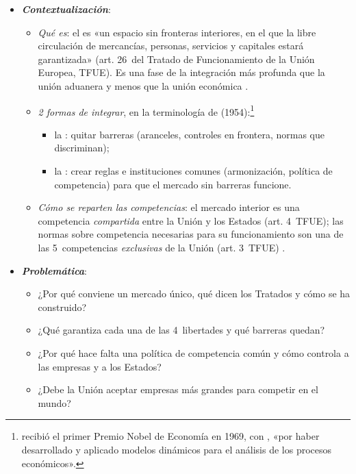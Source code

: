\documentclass[11pt]{article}
\begin{document}
\begin{itemize}
\item \textbf{\emph{Contextualización}}:
  \begin{itemize}
  \item \emph{Qué es}: el  es «un espacio sin fronteras interiores, en el que la libre circulación de mercancías, personas, servicios y capitales estará garantizada» (art. 26~del Tratado de Funcionamiento de la Unión Europea, TFUE)\nocite{UE2016TFUE}. Es una fase de la integración más profunda que la unión aduanera y menos que la unión económica .
  \item \emph{2 formas de integrar}, en la terminología de  (1954)\nocite{Tinbergen1954International}:\footnote{ recibió el primer Premio Nobel de Economía en 1969, con , «por haber desarrollado y aplicado modelos dinámicos para el análisis de los procesos económicos»\nocite{Nobel1969FrischTinbergen}.}
    \begin{itemize}
    \item la : quitar barreras (aranceles, controles en frontera, normas que discriminan);
    \item la : crear reglas e instituciones comunes (armonización, política de competencia) para que el mercado sin barreras funcione.
    \end{itemize}
  \item \emph{Cómo se reparten las competencias}: el mercado interior es una competencia \emph{compartida} entre la Unión y los Estados (art. 4~TFUE); las normas sobre competencia necesarias para su funcionamiento son una de las 5~competencias \emph{exclusivas} de la Unión (art. 3~TFUE) .
  \end{itemize}

\item \textbf{\emph{Problemática}}:
  \begin{itemize}
  \item ¿Por qué conviene un mercado único, qué dicen los Tratados y cómo se ha construido?
  \item ¿Qué garantiza cada una de las 4~libertades y qué barreras quedan?
  \item ¿Por qué hace falta una política de competencia común y cómo controla a las empresas y a los Estados?
  \item ¿Debe la Unión aceptar empresas más grandes para competir en el mundo?
  \end{itemize}


\end{itemize}
\end{document}
